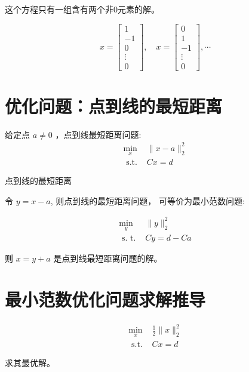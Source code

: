 这个方程只有一组含有两个非0元素的解。

$$
x=\left[\begin{array}{c}
1 \\
-1 \\
0 \\
\vdots \\
0
\end{array}\right], \quad x=\left[\begin{array}{c}
0 \\
1 \\
-1 \\
\vdots \\
0
\end{array}\right], \cdots
$$

\section{优化问题：点到线的最短距离}

\begin{problem}
    给定点 $ a \neq 0 $ ，点到线最短距离问题:
$$
\begin{array}{ll}
\min _{x} & \|x-a\|_{2}^{2} \\
\text { s.t. } & C x=d
\end{array}
$$

\end{problem}

\begin{FigureCenter}{点到线的最短距离}
    
\end{FigureCenter}


令 $ y=x-a $, 则点到线的最短距离问题， 可等价为最小范数问题:

\begin{problem}
    $$
\begin{array}{ll}
\min _{y} & \|y\|_{2}^{2} \\
\text { s. t. } & C y=d-C a
\end{array}
$$
\end{problem}

则 $ x=y+a $ 是点到线最短距离问题的解。

\section{最小范数优化问题求解推导}

\begin{problem}
    $$
\begin{array}{ll}
\min _{x}& \frac{1}{2}\|x\|_{2}^{2} \\
\text { s.t. }& C x=d
\end{array}
$$

求其最优解。
\end{problem}

